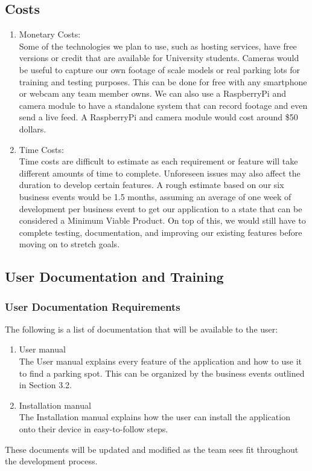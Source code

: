 \documentclass[12pt,letterpaper]{article}
\begin{document}
\subsection{Costs}
\begin{enumerate}
    \item Monetary Costs: \\
    Some of the technologies we plan to use, such as hosting services, have free versions or credit that are available for University students. Cameras would be useful to capture our own footage of scale models or real parking lots for training and testing purposes. This can be done for free with any smartphone or webcam any team member owns. We can also use a RaspberryPi and camera module to have a standalone system that can record footage and even send a live feed. A RaspberryPi and camera module would cost around \$50 dollars.
    
    \item Time Costs: \\
    Time costs are difficult to estimate as each requirement or feature will take different amounts of time to complete. Unforeseen issues may also affect the duration to develop certain features. A rough estimate based on our six business events would be 1.5 months, assuming an average of one week of development per business event to get our application to a state that can be considered a Minimum Viable Product. On top of this, we would still have to complete testing, documentation, and improving our existing features before moving on to stretch goals. 
    
\end{enumerate}

\subsection{User Documentation and Training}

\subsubsection{User Documentation Requirements}
The following is a list of documentation that will be available to the user:
\begin{enumerate}
    \item User manual \\
    The User manual explains every feature of the application and how to use it to find a parking spot. This can be organized by the business events outlined in Section 3.2. 
    \item Installation manual \\
    The Installation manual explains how the user can install the application onto their device in easy-to-follow steps.
\end{enumerate}
These documents will be updated and modified as the team sees fit throughout the development process. 
\end{document}
